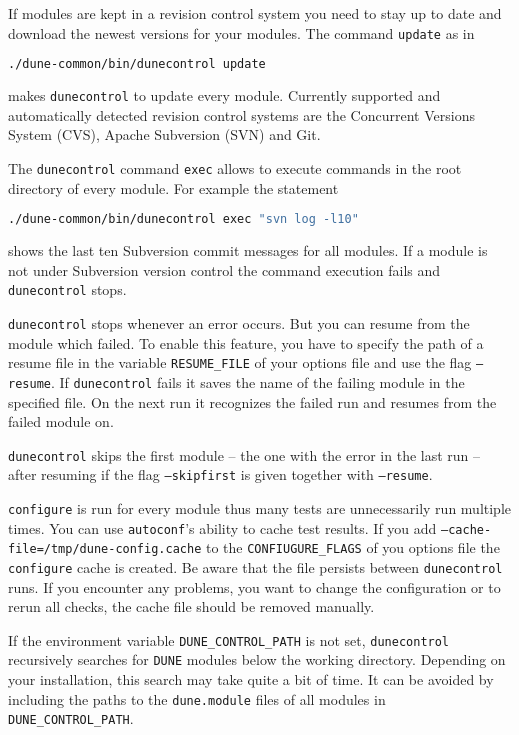\documentclass[11pt,a4paper,headinclude,footinclude,DIV16,normalheadings]{scrartcl}
\newcommand{\dune}{\texttt{DUNE}\xspace}
\newcommand{\autoconf}{\texttt{autoconf}\xspace}
\newcommand{\configure}{\texttt{configure}\xspace}
\newcommand{\dunecontrol}{\texttt{dunecontrol}\xspace}
\begin{document}
If modules are kept in a revision control system you need to stay up to
date and download the newest versions for your modules. The command \texttt{update}
as in
\begin{lstlisting}[language=make]
./dune-common/bin/dunecontrol update
\end{lstlisting}
makes \dunecontrol to update every module. Currently supported and automatically detected 
revision control systems are the Concurrent Versions System (CVS), Apache 
Subversion (SVN) and Git.

The \dunecontrol command \texttt{exec} allows to execute commands in the root
directory of every module. For example the 
statement
\begin{lstlisting}[language=make,showstringspaces=false]
./dune-common/bin/dunecontrol exec "svn log -l10"
\end{lstlisting}
shows the last ten Subversion commit messages for all modules. If a module is 
not under Subversion version control the command execution fails and \dunecontrol 
stops.

\dunecontrol stops whenever an error occurs. But you can resume from the module which
failed. To enable this feature, you have to specify the path of a resume file in the 
variable \texttt{RESUME\_FILE} of your options file and use the flag \texttt{--resume}.
If \dunecontrol fails it saves the name of the failing module in the specified file.
On the next run it recognizes the failed run and resumes from the failed module on.

\dunecontrol skips the first module -- the one with the error in the last run -- after
resuming if the flag \texttt{--skipfirst} is given together with \texttt{--resume}.

\configure is run for every module thus many tests are unnecessarily run multiple times.
You can use \autoconf's ability to cache test results. If you add 
\texttt{--cache-file=/tmp/dune-config.cache} to the \texttt{CONFIUGURE\_FLAGS} of
you options file the \configure  cache is created. Be aware that the file persists 
between \dunecontrol runs. If you encounter any problems, you want to change the 
configuration or to rerun all checks, the cache file should be removed manually.

If the environment variable \texttt{DUNE\_CONTROL\_PATH} is not set, \dunecontrol 
recursively searches for \dune modules below the working directory. Depending on
your installation, this search may take quite a bit of time.  It can be
avoided by including the paths to the \texttt{dune.module} files of all modules in 
\texttt{DUNE\_CONTROL\_PATH}.
\end{document}
